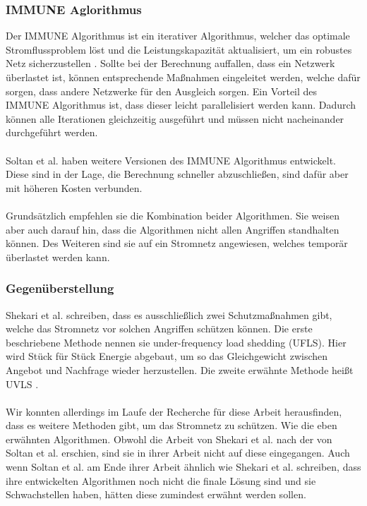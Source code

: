 \documentclass[
    a4paper,
    pagesize,
	pdftex,
    12pt,
]{scrartcl}
\begin{document}
\begin{multicols}{2}
\subsubsection{IMMUNE Aglorithmus}
Der IMMUNE Algorithmus ist ein iterativer Algorithmus, welcher das optimale Stromflussproblem löst und die Leistungskapazität aktualisiert, um ein robustes Netz sicherzustellen \cite{soltan2018protecting}. Sollte bei der Berechnung auffallen, dass ein Netzwerk überlastet ist, können entsprechende Maßnahmen eingeleitet werden, welche dafür sorgen, dass andere Netzwerke für den Ausgleich sorgen. Ein Vorteil des IMMUNE Algorithmus ist, dass dieser leicht parallelisiert werden kann. Dadurch können alle Iterationen gleichzeitig ausgeführt und müssen nicht nacheinander durchgeführt werden.\\ \\ Soltan et al. haben weitere Versionen des IMMUNE Algorithmus entwickelt. Diese sind in der Lage, die Berechnung schneller abzuschließen, sind dafür aber mit höheren Kosten verbunden.\\ \\ Grundsätzlich empfehlen sie die Kombination beider Algorithmen. Sie weisen aber auch darauf hin, dass die Algorithmen nicht allen Angriffen standhalten können. Des Weiteren sind sie auf ein Stromnetz angewiesen, welches temporär überlastet werden kann.
\subsubsection{Gegenüberstellung}
Shekari et al. schreiben, dass es ausschließlich zwei Schutzmaßnahmen gibt, welche das Stromnetz vor solchen Angriffen schützen können. Die erste beschriebene Methode nennen sie \glqq under-frequency load shedding\grqq{} (UFLS). Hier wird Stück für Stück Energie abgebaut, um so das Gleichgewicht zwischen Angebot und Nachfrage wieder herzustellen. Die zweite erwähnte Methode heißt UVLS \cite{280016}. \\ \\ Wir konnten allerdings im Laufe der Recherche für diese Arbeit herausfinden, dass es weitere Methoden gibt, um das Stromnetz zu schützen. Wie die eben erwähnten Algorithmen. Obwohl die Arbeit von Shekari et al. nach der von Soltan et al. erschien, sind sie in ihrer Arbeit nicht auf diese eingegangen. Auch wenn Soltan et al. am Ende ihrer Arbeit ähnlich wie Shekari et al. schreiben, dass ihre entwickelten Algorithmen noch nicht die finale Lösung sind und sie Schwachstellen haben, hätten diese zumindest erwähnt werden sollen.
\newpage

\end{multicols}
\end{document}

